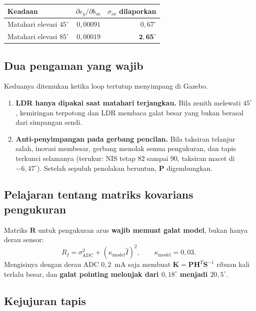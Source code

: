 \documentclass[11pt,a4paper]{article}
\newcommand{\degg}{^\circ}
\begin{document}
\begin{longtable}{l r r}
\toprule
\textbf{Keadaan} & $\partial e_y/\partial b_{\mathrm{az}}$ & $\sigma_{\mathrm{az}}$ \textbf{dilaporkan} \\
\midrule
Matahari elevasi $45\degg$ & $0{,}00091$ & $0{,}67\degg$ \\
Matahari elevasi $85\degg$ & $0{,}00019$ & $\bm{2{,}65\degg}$ \\
\bottomrule
\end{longtable}

\subsection{Dua pengaman yang wajib}

Keduanya ditemukan ketika loop tertutup menyimpang di Gazebo.

\begin{enumerate}[leftmargin=1.4em]
\item \textbf{LDR hanya dipakai saat matahari terjangkau.} Bila zenith melewati $45\degg$, kemiringan
terpotong dan LDR membaca galat besar yang bukan berasal dari simpangan sendi.
\item \textbf{Anti-penyimpangan pada gerbang pencilan.} Bila taksiran telanjur salah, inovasi membesar,
gerbang menolak semua pengukuran, dan tapis terkunci selamanya (terukur: NIS tetap $82$ sampai $90$,
taksiran macet di $-6{,}47\degg$). Setelah sepuluh penolakan beruntun, $\bm{P}$ digembungkan.
\end{enumerate}

\subsection{Pelajaran tentang matriks kovarians pengukuran}

Matriks $\bm{R}$ untuk pengukuran arus \textbf{wajib memuat galat model}, bukan hanya derau sensor:
\begin{equation}
R_I = \sigma_{\mathrm{ADC}}^2 + \left( \kappa_{\mathrm{model}} \hat{I} \right)^2,
\qquad \kappa_{\mathrm{model}} = 0{,}03 .
\end{equation}
Mengisinya dengan derau ADC $0{,}2$~mA saja membuat $\bm{K} = \bm{P}\bm{H}^T\bm{S}^{-1}$ ribuan kali terlalu
besar, dan \textbf{galat pointing melonjak dari $0{,}18\degg$ menjadi $20{,}5\degg$}.

\subsection{Kejujuran tapis}
\end{document}
